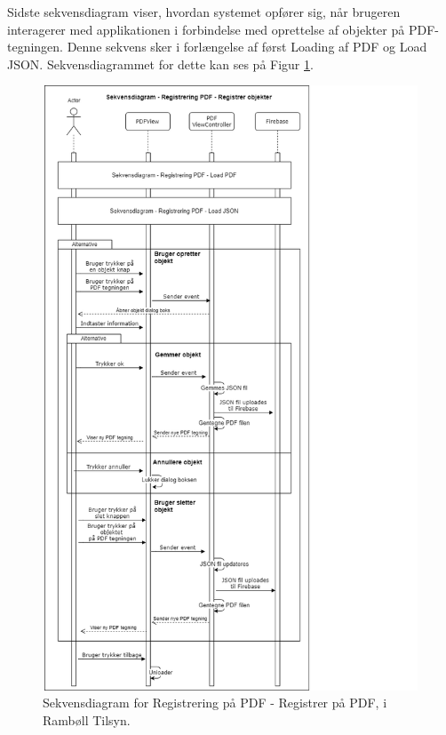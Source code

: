Sidste sekvensdiagram viser, hvordan systemet opfører sig, når brugeren interagerer med applikationen i forbindelse med oprettelse af objekter på PDF-tegningen. Denne sekvens sker i forlængelse af først Loading af PDF og Load JSON. Sekvensdiagrammet for dette kan ses på Figur \ref{fig:RegistrerObjekterSekvensDiagram}.
\begin{figure}[H] %
	\centering
	\includegraphics[height=18cm, width=15cm]{../ArkitekturDesign/Design/RegisterPDF/RegistrerObjekterSekvensDiagram}
	\caption{Sekvensdiagram for Registrering på PDF - Registrer på PDF, i Rambøll Tilsyn.}
	\label{fig:RegistrerObjekterSekvensDiagram}
\end{figure}

\clearpage

